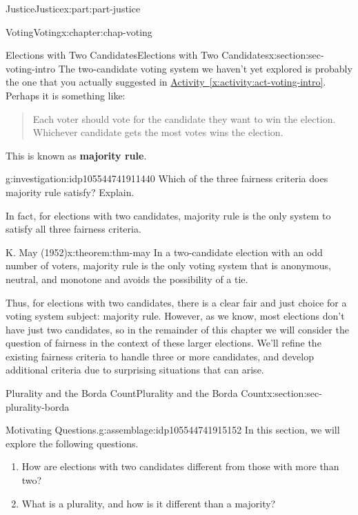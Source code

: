 \documentclass[oneside,10pt,]{book}
\newcommand{\xreffont}{\relax}
\newcommand{\terminology}[1]{\textbf{#1}}
\numberwithin{equation}{section}
\begin{document}
\begin{partptx}{Justice}{}{Justice}{}{}{x:part:part-justice}
\begin{chapterptx}{Voting}{}{Voting}{}{}{x:chapter:chap-voting}
\begin{sectionptx}{Elections with Two Candidates}{}{Elections with Two Candidates}{}{}{x:section:sec-voting-intro}
The two-candidate voting system we haven't yet explored is probably the one that you actually suggested in \hyperref[x:activity:act-voting-intro]{Activity~{\xreffont\ref{x:activity:act-voting-intro}}}. Perhaps it is something like:%
\begin{quote}%
Each voter should vote for the candidate they want to win the election. Whichever candidate gets the most votes wins the election.\end{quote}
This is known as \terminology{majority rule}.%
\begin{investigation}{}{g:investigation:idp105544741911440}%
Which of the three fairness criteria does majority rule satisfy? Explain.%
\end{investigation}%
In fact, for elections with two candidates, majority rule is the only system to satisfy all three fairness criteria.%
\begin{theorem}{}{K. May (1952)}{x:theorem:thm-may}%
In a two-candidate election with an odd number of voters, majority rule is the only voting system that is anonymous, neutral, and monotone and avoids the possibility of a tie.%
\end{theorem}
\begin{conclusion}{}%
Thus, for elections with two candidates, there is a clear fair and just choice for a voting system subject: majority rule. However, as we know, most elections don't have just two candidates, so in the remainder of this chapter we will consider the question of fairness in the context of these larger elections. We'll refine the existing fairness criteria to handle three or more candidates, and develop additional criteria due to surprising situations that can arise.%
\end{conclusion}%
\end{sectionptx}
%
%
\typeout{************************************************}
\typeout{************************************************}
%
\begin{sectionptx}{Plurality and the Borda Count}{}{Plurality and the Borda Count}{}{}{x:section:sec-plurality-borda}
\begin{assemblage}{Motivating Questions.}{g:assemblage:idp105544741915152}%
In this section, we will explore the following questions. %
\begin{enumerate}
\item{}How are elections with two candidates different from those with more than two?%
\item{}What is a plurality, and how is it different than a majority?%

\end{enumerate}
\end{assemblage}
\end{sectionptx}
\end{chapterptx}
\end{partptx}
\end{document}
